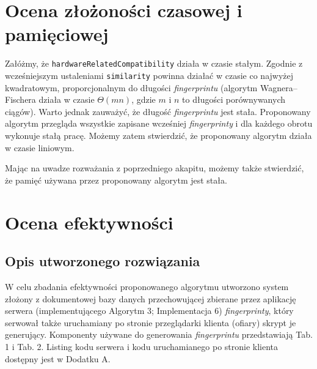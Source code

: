 \section{Ocena złożoności czasowej i pamięciowej}
Załóżmy, że \texttt{hardwareRelatedCompatibility} działa w czasie stałym.
Zgodnie z wcześniejszym ustaleniami \texttt{similarity} powinna działać w czasie
co najwyżej kwadratowym, proporcjonalnym do długości \emph{fingerprintu}
(algorytm Wagnera--Fischera działa w czasie \(\Theta(mn)\), gdzie \(m\) i \(n\)
to długości porównywanych ciągów). Warto jednak zauważyć, że długość
\emph{fingerprintu} jest stała. Proponowany algorytm przegląda wszystkie
zapisane wcześniej \emph{fingerprinty} i dla każdego obrotu wykonuje stałą
pracę. Możemy zatem stwierdzić, że proponowany algorytm działa w czasie
liniowym.

Mając na uwadze rozważania z poprzedniego akapitu, możemy także stwierdzić, że
pamięć używana przez proponowany algorytm jest stała.

\section{Ocena efektywności}

\subsection{Opis utworzonego rozwiązania}
W celu zbadania efektywności proponowanego algorytmu utworzono system złożony z
dokumentowej bazy danych przechowującej zbierane przez aplikację serwera
(implementującego Algorytm 3; Implementacja 6) \emph{fingerprinty}, który
serwował także uruchamiany po stronie przeglądarki klienta (ofiary) skrypt je
generujący. Komponenty używane do generowania \emph{fingerprintu} przedstawiają
Tab. 1 i Tab. 2. Listing kodu serwera i kodu uruchamianego po stronie klienta
dostępny jest w Dodatku A.

